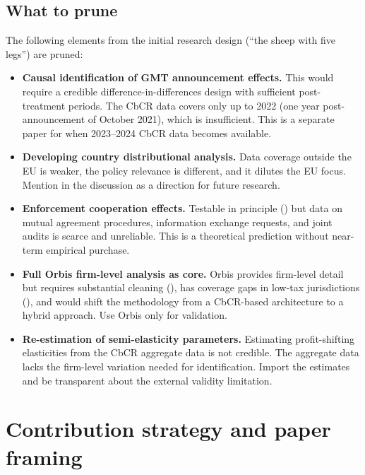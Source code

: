 \documentclass[11pt,a4paper]{article}
\begin{document}
\subsection{What to prune}\label{sec:prune}

The following elements from the initial research design (``the sheep with five legs'') are pruned:

\begin{itemize}
\item \textbf{Causal identification of GMT announcement effects.} This would require a credible difference-in-differences design with sufficient post-treatment periods. The CbCR data covers only up to 2022 (one year post-announcement of October 2021), which is insufficient. This is a separate paper for when 2023--2024 CbCR data becomes available.
\item \textbf{Developing country distributional analysis.} Data coverage outside the EU is weaker, the policy relevance is different, and it dilutes the EU focus. Mention in the discussion as a direction for future research.
\item \textbf{Enforcement cooperation effects.} Testable in principle (\citeauthor{hindriks2025}) but data on mutual agreement procedures, information exchange requests, and joint audits is scarce and unreliable. This is a theoretical prediction without near-term empirical purchase.
\item \textbf{Full Orbis firm-level analysis as core.} Orbis provides firm-level detail but requires substantial cleaning (\citeauthor{ozcan2015}), has coverage gaps in low-tax jurisdictions (\citeauthor{torslov2022}), and would shift the methodology from a CbCR-based architecture to a hybrid approach. Use Orbis only for validation.
\item \textbf{Re-estimation of semi-elasticity parameters.} Estimating profit-shifting elasticities from the CbCR aggregate data is not credible. The aggregate data lacks the firm-level variation needed for identification. Import the estimates and be transparent about the external validity limitation.
\end{itemize}

\section{Contribution strategy and paper framing}\label{sec:contribution}
\end{document}
